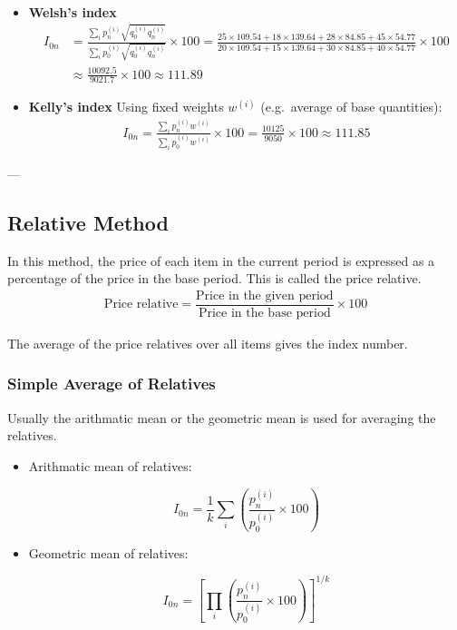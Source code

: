 \documentclass[twoside]{book}
\begin{document}
\begin{itemize}
\item \textbf{Welsh's index}
\begin{align*}
I_{0n} &= \frac{\displaystyle\sum_i p_n^{(i)} \sqrt{q_0^{(i)} q_n^{(i)}}}{\displaystyle\sum_i p_0^{(i)} \sqrt{q_0^{(i)} q_n^{(i)}}} \times 100
= \frac{25\times109.54 + 18\times139.64 + 28\times84.85 + 45\times54.77}{20\times109.54 + 15\times139.64 + 30\times84.85 + 40\times54.77} \times 100\\
&\approx \frac{10092.5}{9021.7} \times 100 \approx 111.89
\end{align*}

\item \textbf{Kelly's index}
Using fixed weights $w^{(i)}$ (e.g.\ average of base quantities):
\begin{align*}
I_{0n} = \frac{\displaystyle\sum_i p_n^{(i)} w^{(i)}}{\displaystyle\sum_i p_0^{(i)} w^{(i)}} \times 100
= \frac{10125}{9050} \times 100 \approx 111.85
\end{align*}
\end{itemize}

---

\subsection{Relative Method}
In this method, the price of each item in the current period is expressed as a percentage of the price in the base period. This is called the price relative.
\begin{align*}
\text{Price relative} = \dfrac{\text{Price in the given period}}{\text{Price in the base period}} \times 100
\end{align*}

The average of the price relatives over all items gives the index number.

\subsubsection{Simple Average of Relatives}
Usually the arithmatic mean or the geometric mean is used for averaging the relatives.
\begin{itemize}
\item Arithmatic mean of relatives:
\begin{textbox}
\begin{equation*}
    I_{0n} = \dfrac{1}{k}\displaystyle\sum_i \left(\frac{p_n^{(i)}}{p_0^{(i)}}\times 100\right)
\end{equation*}
\end{textbox}
\item Geometric mean of relatives:
\begin{textbox}
\begin{equation*}
    I_{0n} = \left[\prod_i \left(\frac{p_n^{(i)}}{p_0^{(i)}}\times 100\right)\right]^{1/k}
\end{equation*}
\end{textbox}
\end{itemize}
\end{document}
